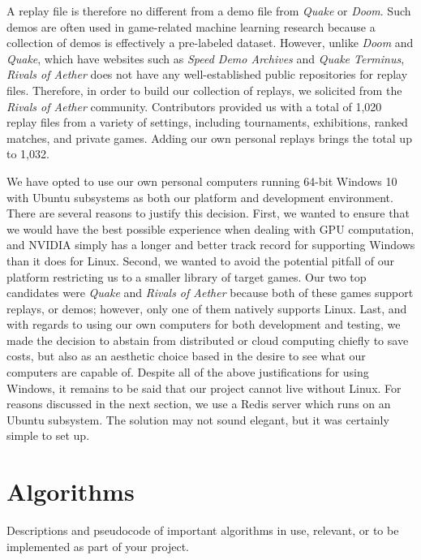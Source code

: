 A replay file is therefore no different from a demo file from {\it Quake} or {\it Doom}. Such demos are often used in game-related machine learning research because a collection of demos is effectively a pre-labeled dataset. However, unlike {\it Doom} and {\it Quake}, which have websites such as {\it Speed Demo Archives} and {\it Quake Terminus}, {\it Rivals of Aether} does not have any well-established public repositories for replay files. Therefore, in order to build our collection of replays, we solicited from the {\it Rivals of Aether} community. Contributors provided us with a total of 1,020 replay files from a variety of settings, including tournaments, exhibitions, ranked matches, and private games. Adding our own personal replays brings the total up to 1,032. 

We have opted to use our own personal computers running 64-bit Windows 10 with Ubuntu subsystems as both our platform and development environment. There are several reasons to justify this decision. First, we wanted to ensure that we would have the best possible experience when dealing with GPU computation, and NVIDIA simply has a longer and better track record for supporting Windows than it does for Linux. Second, we wanted to avoid the potential pitfall of our platform restricting us to a smaller library of target games. Our two top candidates were {\it Quake} and {\it Rivals of Aether} because both of these games support replays, or demos; however, only one of them natively supports Linux. Last, and with regards to using our own computers for both development and testing, we made the decision to abstain from distributed or cloud computing chiefly to save costs, but also as an aesthetic choice based in the desire to see what our computers are capable of. Despite all of the above justifications for using Windows, it remains to be said that our project cannot live without Linux. For reasons discussed in the next section, we use a Redis server which runs on an Ubuntu subsystem. The solution may not sound elegant, but it was certainly simple to set up.




\section{Algorithms}

Descriptions and pseudocode of important algorithms in use, relevant, or to be implemented as part of your project.

